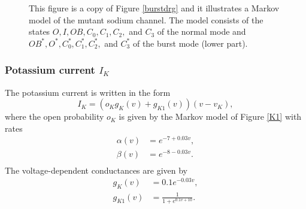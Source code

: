 \begin{figure}[ptb]
\begin{center}
\end{center}
\caption{This figure is a copy of Figure \ref{burstdrg} and it illustrates a Markov model of the mutant sodium channel.
 The model consists of the states $O,I,OB,C_{0}%
,C_{1},C_{2},$ and $C_{3}$ of the normal mode and $OB^*,O^{*},C^{*}_{0},C^{*}%
_{1},C^{*}_{2},$ and $C^{*}_{3}$ of the burst mode (lower part). }%
\label{wtreac3300}
\end{figure}

\subsubsection{Potassium current $I_{K}$}

The potassium current is written in the form
\begin{equation}
I_{K}= (o_{K} g_{K}(v) + g_{K1}(v)) (v-v_{K}),   \label{J_K}
\end{equation}
where the open probability $o_{K}$ is given by the Markov model of Figure  \ref{K1} with rates
\begin{align*}
\alpha(v) &  = e^{-7+0.03v},\\
\beta(v) &  = e^{-8-0.03v}. \\
\end{align*}
The voltage-dependent conductances are given by
\begin{align*}
g_K(v) &=  0.1 e^{-0.03v}, \\
g_{K1}(v) &= \frac{1}{1+e^{0.1 v+10}}. \\
\end{align*}


